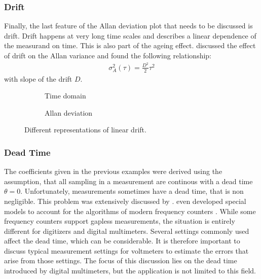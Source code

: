 \clearpage
\subsubsection{Drift}
Finally, the last feature of the Allan deviation plot that needs to be discussed is drift. Drift happens at very long time scales and describes a linear dependence of the measurand on time. This is also part of the ageing effect. \citeauthor{adev_drift} discussed the effect of drift \cite{adev_drift} on the Allan variance and found the following relationship:
\begin{align}
    \sigma_A^2(\tau) = \frac{D^2}{2} \tau^2
\end{align}
with slope of the drift $D$.

\begin{figure}[ht]
    \centering
    \begin{subfigure}{0.32\linewidth}
        \centering
        \scalebox{0.75}{%
            
        } %
        \caption{Time domain}
        \label{fig:drift_time}
    \end{subfigure}
    \begin{subfigure}{0.32\linewidth}
        \centering
        \scalebox{0.75}{%
            
        } %
        \caption{Allan deviation}
        \label{fig:drift_adev}
    \end{subfigure}
    \caption{Different representations of linear drift.}
    \label{fig:drift_noise_simulated}
\end{figure}

\clearpage
\subsubsection{Dead Time}%
\label{sec:dead_time}
The coefficients given in the previous examples were derived using the assumption, that all sampling in a measurement are continous with a dead time $\theta = 0$. Unfortunately, measurements sometimes have a dead time, that is non negligible. This problem was extensively discussed by \citeauthor{psd_to_adev} \cite{psd_to_adev}. \citeauthor{adev_frequency_counter} even developed special models to account for the algorithms of modern frequency counters \cite{adev_frequency_counter}. While some frequency counters support gapless measurements, the situation is entirely different for digitizers and digital multimeters. Several settings commonly used affect the dead time, which can be considerable. It is therefore important to discuss typical measurement settings for voltmeters to estimate the errors that arise from those settings. The focus of this discussion lies on the dead time introduced by digital multimeters, but the application is not limited to this field.

